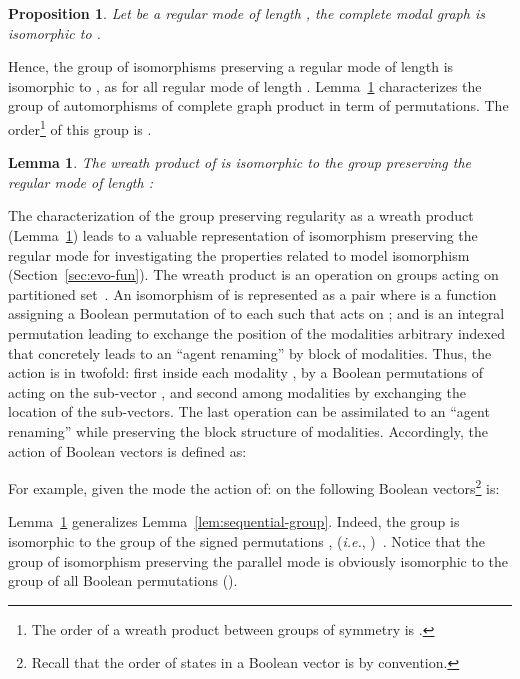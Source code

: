 \documentclass[12pt]{elsarticle}
\newtheorem{lemma}{Lemma}
\newtheorem{proposition}{Proposition}
\newcommand{\abbrev}[1]{#1, \relax}
\newcommand{\ie}[0]{\abbrev{\textit{i.e.}}}
\begin{document}
\begin{proposition}
\label{prop:srm}
Let  be a regular mode of length , the complete modal graph  is isomorphic to .
\end{proposition}
 Hence, the group of isomorphisms preserving a regular mode of length  is isomorphic to , as  for all regular mode  of length . Lemma~\ref{lem:srm} characterizes the group of automorphisms of complete graph product in term of permutations. The order\footnote{The order of a wreath product between groups of symmetry  is .} of this group is .

\begin{lemma} 
\label{lem:srm}
The wreath product of  is isomorphic to the group preserving the regular mode of length :

\end{lemma}

The characterization of the group preserving regularity as a wreath product (Lemma~\ref{lem:srm}) leads to  a valuable representation of isomorphism preserving the regular mode for investigating the properties related to model isomorphism (Section~\ref{sec:evo-fun}).  
The wreath product is an operation on groups acting on partitioned set~\cite{Cameron1999}. An isomorphism of    is represented as a pair  where  is a function assigning a Boolean permutation of  to each  such that  acts on ; and  is an integral  permutation  leading to exchange the position of the modalities arbitrary indexed that concretely leads to an ``agent renaming'' by block of modalities. Thus, the action is in twofold: first inside each modality , by a  Boolean permutations of  acting on the sub-vector , and second among modalities by exchanging the location of the sub-vectors. The last operation can be assimilated to an ``agent renaming'' while preserving the block structure of modalities. Accordingly, the action of Boolean vectors is defined as:

For example, given the mode  the action of:
 on the following Boolean vectors\footnote{Recall that the order of states in a Boolean vector is  by convention.} is:
 


 Lemma~\ref{lem:srm} generalizes Lemma~\ref{lem:sequential-group}. Indeed, the group  is isomorphic to the group of the signed permutations , (\ie )~\cite{Harary2000}.
Notice that the group of isomorphism preserving the parallel mode  is obviously isomorphic to the group of all Boolean permutations  ().
\end{document}
